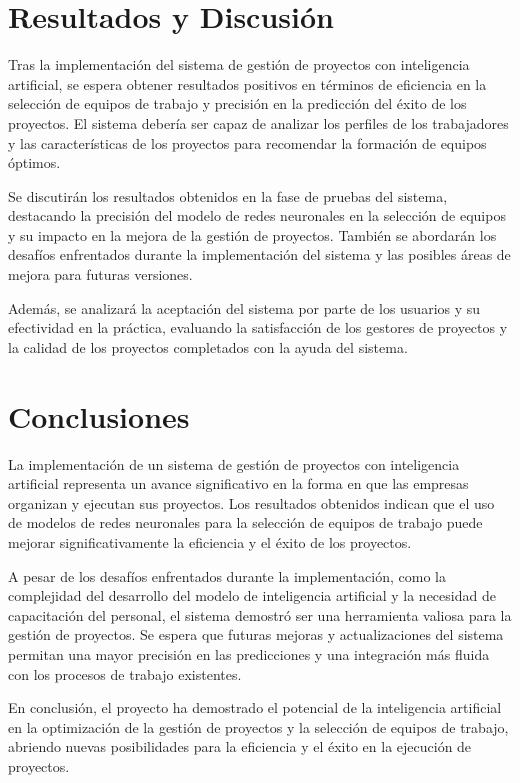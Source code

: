 \documentclass{article}
\begin{document}
\section{Resultados y Discusión}
    Tras la implementación del sistema de gestión de proyectos con inteligencia artificial, se espera obtener resultados positivos en términos de eficiencia en la selección de equipos de trabajo y precisión en la predicción del éxito de los proyectos. El sistema debería ser capaz de analizar los perfiles de los trabajadores y las características de los proyectos para recomendar la formación de equipos óptimos.

    Se discutirán los resultados obtenidos en la fase de pruebas del sistema, destacando la precisión del modelo de redes neuronales en la selección de equipos y su impacto en la mejora de la gestión de proyectos. También se abordarán los desafíos enfrentados durante la implementación del sistema y las posibles áreas de mejora para futuras versiones.

    Además, se analizará la aceptación del sistema por parte de los usuarios y su efectividad en la práctica, evaluando la satisfacción de los gestores de proyectos y la calidad de los proyectos completados con la ayuda del sistema.

\section{Conclusiones}
    La implementación de un sistema de gestión de proyectos con inteligencia artificial representa un avance significativo en la forma en que las empresas organizan y ejecutan sus proyectos. Los resultados obtenidos indican que el uso de modelos de redes neuronales para la selección de equipos de trabajo puede mejorar significativamente la eficiencia y el éxito de los proyectos.

    A pesar de los desafíos enfrentados durante la implementación, como la complejidad del desarrollo del modelo de inteligencia artificial y la necesidad de capacitación del personal, el sistema demostró ser una herramienta valiosa para la gestión de proyectos. Se espera que futuras mejoras y actualizaciones del sistema permitan una mayor precisión en las predicciones y una integración más fluida con los procesos de trabajo existentes.

    En conclusión, el proyecto ha demostrado el potencial de la inteligencia artificial en la optimización de la gestión de proyectos y la selección de equipos de trabajo, abriendo nuevas posibilidades para la eficiencia y el éxito en la ejecución de proyectos.
\end{document}
